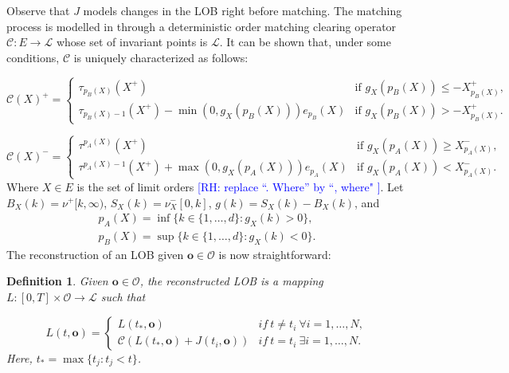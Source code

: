 \documentclass[10pt,a4paper,oneside]{article}
\newcommand{\Bo}{\mathcal{L}}
\newcommand{\rh}[1]{\textcolor{blue}{\textsf{[RH: #1]}}}
\newtheorem{definition}{Definition}
\begin{document}
Observe that $J$ models changes in the LOB right before matching. The matching process is modelled in \cite{cont2023mathematical} through a deterministic order matching clearing operator $\mathcal{C} : E \rightarrow \Bo$ whose set of invariant points is $\Bo$. It can be shown that, under some conditions, $\mathcal{C}$ is uniquely characterized as follows:

\begin{equation*}
    \mathcal{C}(X)^+ = \begin{cases}
        \tau_{p_B(X)}(X^+) & \text{if } g_X(p_B(X)) \leq - X^+_{p_B(X)},\\
        \tau_{p_B(X) - 1}(X^+) - \min(0, g_X(p_B(X))) e_{p_B}(X) & \text{if } g_X(p_B(X)) > - X^+_{p_B(X)}.  
    \end{cases}
\end{equation*}

\begin{equation*}
    \mathcal{C}(X)^- = \begin{cases}
        \tau^{p_A(X)}(X^+) & \text{if } g_X(p_A(X)) \geq X^-_{p_A(X)},\\
        \tau^{p_A(X) - 1}(X^+) + \max(0, g_X(p_A(X))) e_{p_A}(X) & \text{if } g_X(p_A(X)) <  X^-_{p_A(X)}.  
    \end{cases}
\end{equation*}
Where $X \in E$ is the set of limit orders \rh{replace ``. Where'' by ``, where" }. Let $B_X(k) = \nu^+[k, \infty)$, $S_X(k) = \nu^-_X[0, k]$, $g(k) = S_X(k) - B_X(k)$, and
\begin{align*}
    p_A(X) = \inf \{ k \in \{1, \dots, d \} : g_X(k) > 0 \},\\
    p_B(X) = \sup \{ k \in \{1, \dots, d \} : g_X(k) < 0 \}.
\end{align*}
The reconstruction of an LOB given $\mathbf{o} \in  \mathcal{O}$ is now straightforward:

\begin{definition} Given $\mathbf{o} \in \mathcal{O}$, the reconstructed LOB is a mapping $L : [0, T] \times \mathcal{O} \rightarrow \Bo$ such that 

\begin{equation*}
    L(t, \mathbf{o}) =\begin{cases}
        L(t_*, \mathbf{o}) & if \ t \neq t_i\ \forall i = 1, \dots, N,\\
        \mathcal{C}\left( L(t_*, \mathbf{o}) + J(t_i, \mathbf{o}) \right) & if \ t = t_i \ \exists i = 1, \dots, N.
    \end{cases}
    \label{def:LOB_reconstructor}
\end{equation*}
Here, $t_* = \max\{t_j : t_j < t\}$.
\end{definition}
\end{document}
